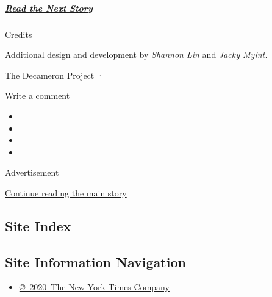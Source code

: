 \hypertarget{read-the-next-story}{%
\subparagraph{\texorpdfstring{\href{https://www.nytimes3xbfgragh.onion/interactive/2020/07/07/magazine/laila-lalami-short-story.html}{Read
the Next Story}}{Read the Next Story}}\label{read-the-next-story}}

Credits

Additional design and development by \emph{Shannon Lin} and \emph{Jacky
Myint.}

The Decameron Project ·

Write a comment

\begin{itemize}
\item
\item
\item
\item
\end{itemize}

Advertisement

\protect\hyperlink{after-bottom}{Continue reading the main story}

\hypertarget{site-index}{%
\subsection{Site Index}\label{site-index}}

\hypertarget{site-information-navigation}{%
\subsection{Site Information
Navigation}\label{site-information-navigation}}

\begin{itemize}
\tightlist
\item
  \href{https://help.nytimes3xbfgragh.onion/hc/en-us/articles/115014792127-Copyright-notice}{©~2020~The
  New York Times Company}
\end{itemize}

